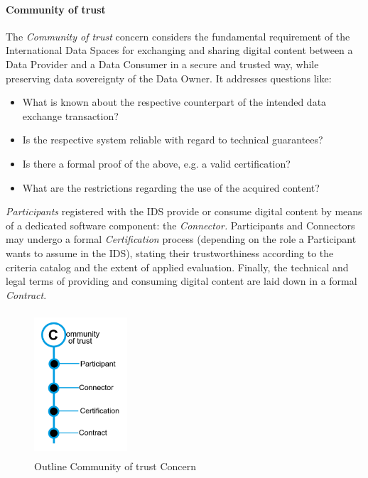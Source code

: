 \paragraph{Community of trust\\}
The \textit{Community of trust} concern considers the fundamental requirement of the International Data Spaces for exchanging and sharing digital content between a Data Provider and a Data Consumer in a secure and trusted way, while preserving data sovereignty of the Data Owner. It addresses questions like: 
 \begin{itemize}
	\item What is known about the respective counterpart of the intended data exchange transaction? 
 	\item Is the respective system reliable with regard to technical guarantees? 
 	\item Is there a formal proof of the above, e.g. a valid certification? 
 	\item What are the restrictions regarding the use of the acquired content?
\end{itemize} 
 \textit{Participants }registered with the IDS provide or consume digital content by means of a dedicated software component: the \textit{Connector. }Participants and Connectors may undergo a formal \textit{Certification }process (depending on the role a Participant wants to assume in the IDS), stating their trustworthiness according to the criteria catalog and the extent of applied evaluation. Finally, the technical and legal terms of providing and consuming digital content are laid down in a formal \textit{Contract}.


\begin{figure}[H]
	\begin{Center}
		\includegraphics[width=1.36in,height=2.12in]{./media/image48.png}
		\caption{Outline Community of trust Concern}
		\label{fig:community_of_trust_concern}
	\end{Center}
\end{figure}


